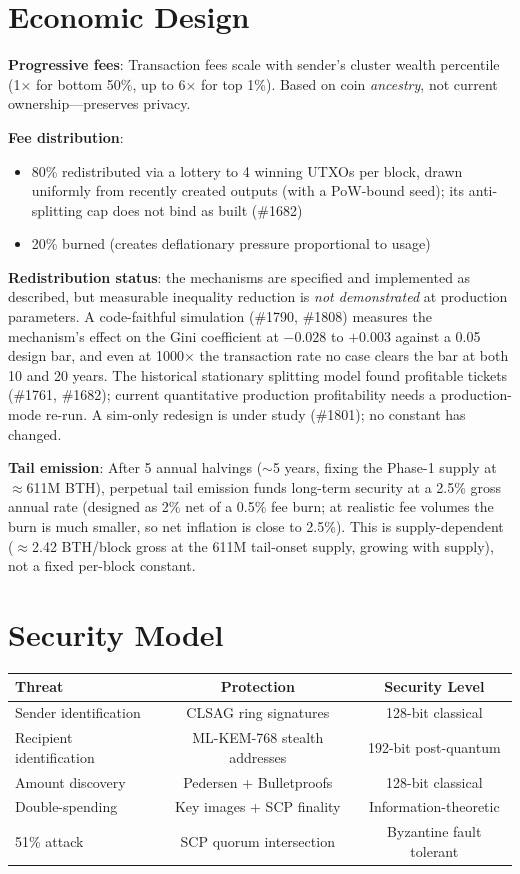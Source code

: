 \documentclass[11pt]{article}
\begin{document}
\section*{Economic Design}

\textbf{Progressive fees}: Transaction fees scale with sender's cluster wealth
percentile (1$\times$ for bottom 50\%, up to 6$\times$ for top 1\%). Based on
coin \emph{ancestry}, not current ownership---preserves privacy.

\textbf{Fee distribution}:
\begin{itemize}
\item 80\% redistributed via a lottery to 4 winning UTXOs per block, drawn
  uniformly from recently created outputs (with a PoW-bound seed); its
  anti-splitting cap does not bind as built (\#1682)
\item 20\% burned (creates deflationary pressure proportional to usage)
\end{itemize}

\textbf{Redistribution status}: the mechanisms are specified and implemented
as described, but measurable inequality reduction is \emph{not demonstrated}
at production parameters. A code-faithful simulation (\#1790, \#1808)
measures the mechanism's effect on the Gini coefficient at $-0.028$ to
$+0.003$ against a 0.05 design bar, and even at 1000$\times$ the
transaction rate no case clears the bar at both 10 and 20 years. The historical stationary splitting model found profitable tickets
(\#1761, \#1682); current quantitative production profitability needs a
production-mode re-run. A
sim-only redesign is under study (\#1801); no constant has changed.

\textbf{Tail emission}: After 5 annual halvings ($\sim$5 years, fixing the
Phase-1 supply at $\approx$611M BTH), perpetual tail emission funds long-term
security at a 2.5\% gross annual rate (designed as 2\% net of a 0.5\% fee
burn; at realistic fee volumes the burn is much smaller, so net inflation is
close to 2.5\%). This is supply-dependent ($\approx$2.42 BTH/block gross at the
611M tail-onset supply, growing with supply), not a fixed per-block constant.

\section*{Security Model}

\begin{tabular}{@{}lcc@{}}
\toprule
\textbf{Threat} & \textbf{Protection} & \textbf{Security Level} \\
\midrule
Sender identification & CLSAG ring signatures & 128-bit classical \\
Recipient identification & ML-KEM-768 stealth addresses & 192-bit post-quantum \\
Amount discovery & Pedersen + Bulletproofs & 128-bit classical \\
Double-spending & Key images + SCP finality & Information-theoretic \\
51\% attack & SCP quorum intersection & Byzantine fault tolerant \\
\bottomrule
\end{tabular}
\end{document}
